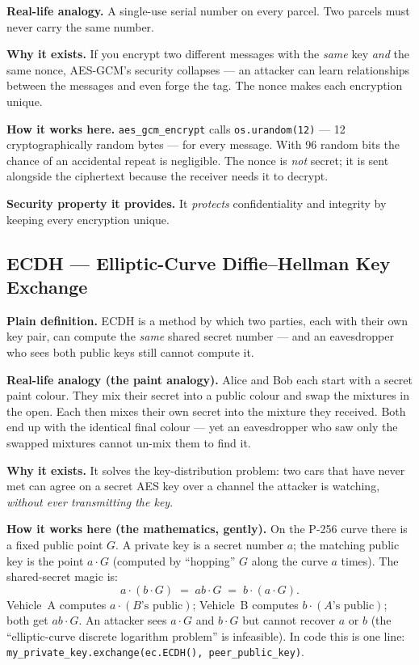 \documentclass[11pt,a4paper]{article}
\begin{document}
\textbf{Real-life analogy.} A single-use serial number on every parcel. Two
parcels must never carry the same number.

\textbf{Why it exists.} If you encrypt two different messages with the \emph{same}
key \emph{and} the same nonce, AES-GCM's security collapses --- an attacker can
learn relationships between the messages and even forge the tag. The nonce makes
each encryption unique.

\textbf{How it works here.} \texttt{aes\_gcm\_encrypt} calls
\texttt{os.urandom(12)} --- 12 cryptographically random bytes --- for every
message. With 96 random bits the chance of an accidental repeat is negligible.
The nonce is \emph{not} secret; it is sent alongside the ciphertext because the
receiver needs it to decrypt.

\textbf{Security property it provides.} It \emph{protects} confidentiality and
integrity by keeping every encryption unique.

\subsection{ECDH --- Elliptic-Curve Diffie--Hellman Key Exchange}
\textbf{Plain definition.} ECDH is a method by which two parties, each with their
own key pair, can compute the \emph{same} shared secret number --- and an
eavesdropper who sees both public keys still cannot compute it.

\textbf{Real-life analogy (the paint analogy).} Alice and Bob each start with a
secret paint colour. They mix their secret into a public colour and swap the
mixtures in the open. Each then mixes their own secret into the mixture they
received. Both end up with the identical final colour --- yet an eavesdropper who
saw only the swapped mixtures cannot un-mix them to find it.

\textbf{Why it exists.} It solves the key-distribution problem: two cars that
have never met can agree on a secret AES key over a channel the attacker is
watching, \emph{without ever transmitting the key}.

\textbf{How it works here (the mathematics, gently).} On the P-256 curve there is
a fixed public point $G$. A private key is a secret number $a$; the matching
public key is the point $a\cdot G$ (computed by ``hopping'' $G$ along the curve
$a$ times). The shared-secret magic is:
\[
a\cdot(b\cdot G)\;=\;ab\cdot G\;=\;b\cdot(a\cdot G).
\]
Vehicle~A computes $a\cdot(B\text{'s public})$; Vehicle~B computes
$b\cdot(A\text{'s public})$; both get $ab\cdot G$. An attacker sees $a\cdot G$
and $b\cdot G$ but cannot recover $a$ or $b$ (the ``elliptic-curve discrete
logarithm problem'' is infeasible). In code this is one line:
\texttt{my\_private\_key.exchange(ec.ECDH(), peer\_public\_key)}.
\end{document}
